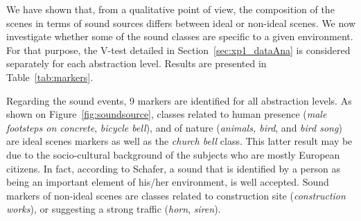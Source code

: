 \documentclass[12pt]{elsarticle}
\begin{document}
We have shown that, from a qualitative point of view, the composition of the scenes in terms of sound sources differs between ideal or non-ideal scenes. We now investigate whether some of the sound classes are specific to a given environment. For that purpose, the V-test detailed in Section~\ref{sec:xp1_dataAna} is considered separately for each abstraction level. Results are presented in Table~\ref{tab:markers}.


Regarding the sound events, 9 markers are identified for all abstraction levels. As shown on Figure~\ref{fig:soundsource}, classes related to human presence (\emph{male footsteps on concrete}, \emph{bicycle bell}), and of nature (\emph{animals, bird}, and \emph{bird song}) are ideal scenes markers as well as the \emph{church bell} class. This latter result may be due to the socio-cultural background of the subjects who are mostly European citizens. In fact, according to Schafer, a sound that is identified by a person as being an important element of his/her environment, is well accepted. Sound markers of non-ideal scenes are classes related to construction site (\emph{construction works}), or suggesting a strong traffic (\emph{horn}, \emph{siren}).

\end{document}

